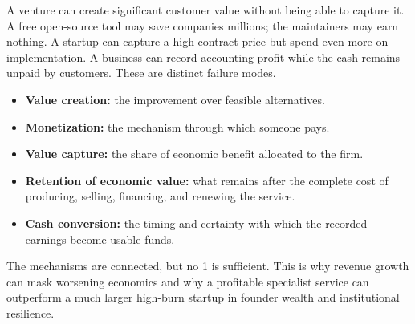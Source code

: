 A venture can create significant customer value without being able to capture it. A free open-source tool may save companies millions; the maintainers may earn nothing. A startup can capture a high contract price but spend even more on implementation. A business can record accounting profit while the cash remains unpaid by customers. These are distinct failure modes.

\begin{itemize}
  \item \textbf{Value creation:} the improvement over feasible alternatives.
  \item \textbf{Monetization:} the mechanism through which someone pays.
  \item \textbf{Value capture:} the share of economic benefit allocated to the firm.
  \item \textbf{Retention of economic value:} what remains after the complete cost of producing, selling, financing, and renewing the service.
  \item \textbf{Cash conversion:} the timing and certainty with which the recorded earnings become usable funds.
\end{itemize}

The mechanisms are connected, but no 1 is sufficient. This is why revenue growth can mask worsening economics and why a profitable specialist service can outperform a much larger high-burn startup in founder wealth and institutional resilience.
